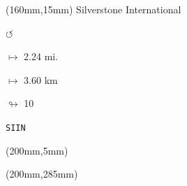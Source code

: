 \begin{textblock*}{40mm}(160mm,15mm)%
Silverstone International
\par \Huge$\circlearrowleft$
\Large
\par$\mapsto$ 2.24 mi.
\par$\mapsto$ 3.60 km
\par$\looparrowright$ 10
\par\hfill\tiny\tt SIIN\\
\end{textblock*}
\begin{textblock*}{20mm}(200mm,5mm)%
\fbox{\thepage}
\end{textblock*}
\begin{textblock*}{20mm}(200mm,285mm)%
\fbox{\thepage}
\end{textblock*}
\null\newpage

